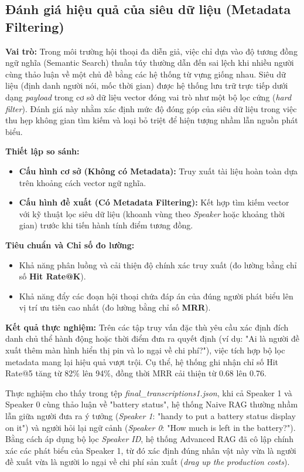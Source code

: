 \subsection{Đánh giá hiệu quả của siêu dữ liệu (Metadata Filtering)}

\textbf{Vai trò:}
Trong môi trường hội thoại đa diễn giả, việc chỉ dựa vào độ tương đồng ngữ nghĩa (Semantic Search) thuần túy thường dẫn đến sai lệch khi nhiều người cùng thảo luận về một chủ đề bằng các hệ thống từ vựng giống nhau. Siêu dữ liệu (định danh người nói, mốc thời gian) được hệ thống lưu trữ trực tiếp dưới dạng \textit{payload} trong cơ sở dữ liệu vector đóng vai trò như một bộ lọc cứng (\textit{hard filter}). Đánh giá này nhằm xác định mức độ đóng góp của siêu dữ liệu trong việc thu hẹp không gian tìm kiếm và loại bỏ triệt để hiện tượng nhầm lẫn nguồn phát biểu.

\textbf{Thiết lập so sánh:}
\begin{itemize}[leftmargin=*, label={}]
    \item \textbf{Cấu hình cơ sở (Không có Metadata):} Truy xuất tài liệu hoàn toàn dựa trên khoảng cách vector ngữ nghĩa.
    \item \textbf{Cấu hình đề xuất (Có Metadata Filtering):} Kết hợp tìm kiếm vector với kỹ thuật lọc siêu dữ liệu (khoanh vùng theo \textit{Speaker} hoặc khoảng thời gian) trước khi tiến hành tính điểm tương đồng.
\end{itemize}

\textbf{Tiêu chuẩn và Chỉ số đo lường:}
\begin{itemize}[leftmargin=*, label={}]
    \item Khả năng phân luồng và cải thiện độ chính xác truy xuất (đo lường bằng chỉ số \textbf{Hit Rate@K}).
    \item Khả năng đẩy các đoạn hội thoại chứa đáp án của đúng người phát biểu lên vị trí ưu tiên cao nhất (đo lường bằng chỉ số \textbf{MRR}).
\end{itemize}

\textbf{Kết quả thực nghiệm:}
Trên các tập truy vấn đặc thù yêu cầu xác định đích danh chủ thể hành động hoặc thời điểm đưa ra quyết định (ví dụ: "Ai là người đề xuất thêm màn hình hiển thị pin và lo ngại về chi phí?"), việc tích hợp bộ lọc metadata mang lại hiệu quả vượt trội. Cụ thể, hệ thống ghi nhận chỉ số Hit Rate@5 tăng từ 82\% lên 94\%, đồng thời MRR cải thiện từ 0.68 lên 0.76. 

Thực nghiệm cho thấy trong tệp \textit{final\_transcriptions1.json}, khi cả Speaker 1 và Speaker 0 cùng thảo luận về "battery status", hệ thống Naive RAG thường nhầm lẫn giữa người đưa ra ý tưởng (\textit{Speaker 1}: "handy to put a battery status display on it") và người hỏi lại ngữ cảnh (\textit{Speaker 0}: "How much is left in the battery?"). Bằng cách áp dụng bộ lọc \textit{Speaker ID}, hệ thống Advanced RAG đã cô lập chính xác các phát biểu của Speaker 1, từ đó xác định đúng nhân vật này vừa là người đề xuất vừa là người lo ngại về chi phí sản xuất (\textit{drag up the production costs}).

